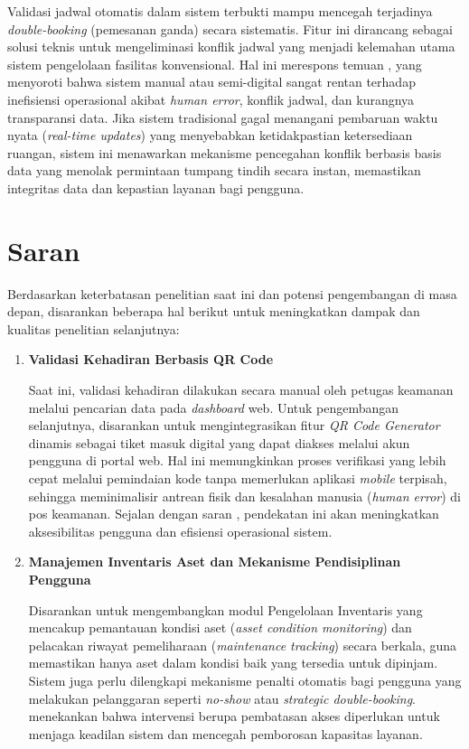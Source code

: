 \begin{enumerate}
    Validasi jadwal otomatis dalam sistem terbukti mampu mencegah terjadinya \textit{double-booking} (pemesanan ganda) secara sistematis. Fitur ini dirancang sebagai solusi teknis untuk mengeliminasi konflik jadwal yang menjadi kelemahan utama sistem pengelolaan fasilitas konvensional. Hal ini merespons temuan \textcite{Patel}, yang menyoroti bahwa sistem manual atau semi-digital sangat rentan terhadap inefisiensi operasional akibat \textit{human error}, konflik jadwal, dan kurangnya transparansi data. Jika sistem tradisional gagal menangani pembaruan waktu nyata (\textit{real-time updates}) yang menyebabkan ketidakpastian ketersediaan ruangan, sistem ini menawarkan mekanisme pencegahan konflik berbasis basis data yang menolak permintaan tumpang tindih secara instan, memastikan integritas data dan kepastian layanan bagi pengguna.
\end{enumerate}

\section{Saran}
Berdasarkan keterbatasan penelitian saat ini dan potensi pengembangan di masa depan, disarankan beberapa hal berikut untuk meningkatkan dampak dan kualitas penelitian selanjutnya:

\begin{enumerate}
    \item \textbf{Validasi Kehadiran Berbasis QR Code}
    
    Saat ini, validasi kehadiran dilakukan secara manual oleh petugas keamanan melalui pencarian data pada \textit{dashboard} web. Untuk pengembangan selanjutnya, disarankan untuk mengintegrasikan fitur \textit{QR Code Generator} dinamis sebagai tiket masuk digital yang dapat diakses melalui akun pengguna di portal web. Hal ini memungkinkan proses verifikasi yang lebih cepat melalui pemindaian kode tanpa memerlukan aplikasi \textit{mobile} terpisah, sehingga meminimalisir antrean fisik dan kesalahan manusia (\textit{human error}) di pos keamanan. Sejalan dengan saran \textcite{Patel}, pendekatan ini akan meningkatkan aksesibilitas pengguna dan efisiensi operasional sistem.

    \item \textbf{Manajemen Inventaris Aset dan Mekanisme Pendisiplinan Pengguna}
    
    Disarankan untuk mengembangkan modul Pengelolaan Inventaris yang mencakup pemantauan kondisi aset (\textit{asset condition monitoring}) dan pelacakan riwayat pemeliharaan (\textit{maintenance tracking}) secara berkala, guna memastikan hanya aset dalam kondisi baik yang tersedia untuk dipinjam. Sistem juga perlu dilengkapi mekanisme penalti otomatis bagi pengguna yang melakukan pelanggaran seperti \textit{no-show} atau \textit{strategic double-booking}. \textcite{Baron} menekankan bahwa intervensi berupa pembatasan akses diperlukan untuk menjaga keadilan sistem dan mencegah pemborosan kapasitas layanan.
\end{enumerate}
